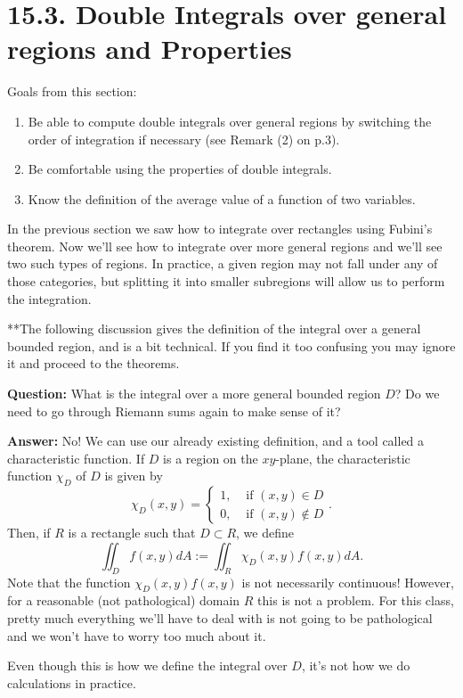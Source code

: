 \documentclass[12pt]{article}
\title{}
\begin{document}
\section*{15.3. Double Integrals over general regions and Properties}
Goals from this section:
\begin{enumerate}
\item Be able to compute double integrals over general regions by switching the order of integration if necessary (see Remark (2) on p.3).
\item Be comfortable using the properties of double integrals.
\item Know the definition of the average value of a function of two variables.
\end{enumerate}
In the previous section we saw how to integrate over rectangles using Fubini's theorem. Now we'll see how to integrate over more general regions and we'll see two such types of regions. In practice, a given region may not fall under any of those categories, but splitting it into smaller subregions will allow us to perform the integration.

\vspace{.1 in}

**The following discussion gives the definition of the integral over a general bounded region, and is a bit technical. If you find it too confusing you may ignore it and proceed to the theorems.

\textbf{Question:} What is the integral over a more general bounded region $D$? Do we need to go through Riemann sums again to make sense of it?

\textbf{Answer:} No! We can use our already existing definition, and a tool called a characteristic function. If $D$ is a region on the $xy$-plane, the characteristic function $\chi_D$ of $D$ is given by $$\chi_D(x,y)=\begin{cases}
1, & \text{ if }(x,y)\in D \\
0, &\text{ if }(x,y)\notin D
\end{cases}.$$
Then, if $R$ is a rectangle such that $D\subset R$, we define $$\iint_D f(x,y)dA:= \iint_R \chi_D(x,y) f(x,y)dA.$$ Note that the function $\chi_D(x,y) f(x,y)$ is not necessarily continuous! However, for a reasonable (not pathological) domain $R$ this is not a problem. For this class, pretty much everything we'll have to deal with is not going to be pathological and we won't have to worry too much about it. 

Even though this is how we define the integral over $D$, it's not how we do calculations in practice.
\end{document}
